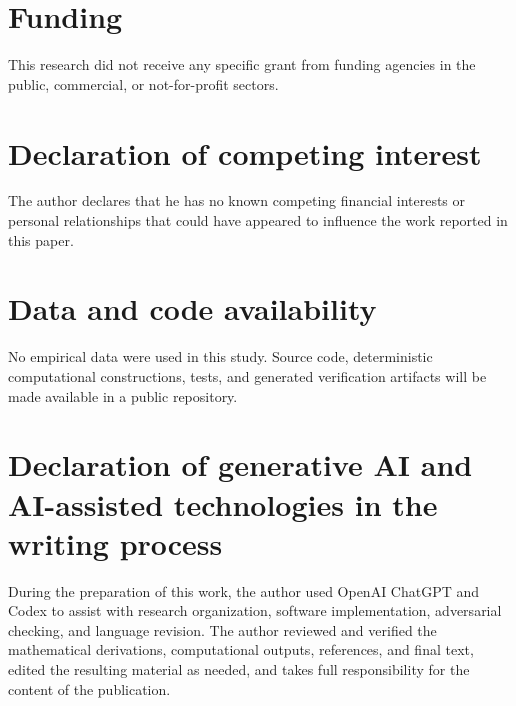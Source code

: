 \documentclass[a4paper,fleqn]{cas-dc}
\begin{document}

\section*{Funding}

This research did not receive any specific grant from funding agencies
in the public, commercial, or not-for-profit sectors.

\section*{Declaration of competing interest}

The author declares that he has no known competing financial interests
or personal relationships that could have appeared to influence the
work reported in this paper.

\section*{Data and code availability}

No empirical data were used in this study. Source code, deterministic
computational constructions, tests, and generated verification artifacts
will be made available in a public repository.

\section*{
Declaration of generative AI and AI-assisted technologies in the
writing process
}

During the preparation of this work, the author used OpenAI ChatGPT and
Codex to assist with research organization, software implementation,
adversarial checking, and language revision. The author reviewed and
verified the mathematical derivations, computational outputs,
references, and final text, edited the resulting material as needed,
and takes full responsibility for the content of the publication.




\end{document}
